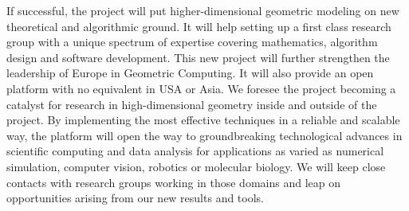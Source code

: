 
If successful, the project will put higher-dimensional geometric modeling on new theoretical and algorithmic ground. It will help setting up a first class research group with a unique spectrum of expertise covering mathematics, algorithm design and software development.
This new project will further strengthen the leadership of Europe  in Geometric Computing.
It will also provide an open platform with no equivalent in USA or Asia.
We foresee the project becoming a catalyst for research in high-dimensional geometry inside and outside of the project.  
By implementing the most effective techniques in a  reliable and scalable way, the platform will
open the way to groundbreaking technological advances in scientific computing and data analysis for applications as varied as numerical simulation, computer vision, robotics or molecular biology. We will keep close contacts with research groups working in those domains and leap on opportunities arising from our new results and tools.

{\footnotesize


}


